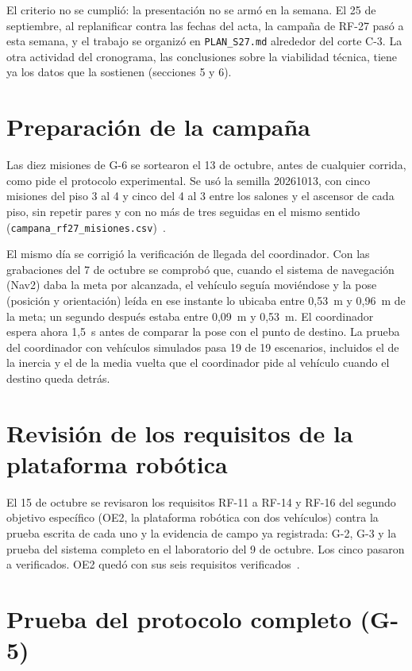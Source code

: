 \documentclass[12pt,letterpaper]{article}
\begin{document}
El criterio no se cumplió: la presentación no se armó en la semana. El 25 de septiembre, al replanificar contra las fechas del acta, la campaña de RF-27 pasó a esta semana, y el trabajo se organizó en \texttt{PLAN\_S27.md} alrededor del corte C-3. La otra actividad del cronograma, las conclusiones sobre la viabilidad técnica, tiene ya los datos que la sostienen (secciones 5 y 6).

\section{Preparación de la campaña}

Las diez misiones de G-6 se sortearon el 13 de octubre, antes de cualquier corrida, como pide el protocolo experimental. Se usó la semilla 20261013, con cinco misiones del piso 3 al 4 y cinco del 4 al 3 entre los salones y el ascensor de cada piso, sin repetir pares y con no más de tres seguidas en el mismo sentido (\texttt{campana\_rf27\_misiones.csv})~\cite{plan,estado}.

El mismo día se corrigió la verificación de llegada del coordinador. Con las grabaciones del 7 de octubre se comprobó que, cuando el sistema de navegación (Nav2) daba la meta por alcanzada, el vehículo seguía moviéndose y la pose (posición y orientación) leída en ese instante lo ubicaba entre 0,53~m y 0,96~m de la meta; un segundo después estaba entre 0,09~m y 0,53~m. El coordinador espera ahora 1,5~s antes de comparar la pose con el punto de destino. La prueba del coordinador con vehículos simulados pasa 19 de 19 escenarios, incluidos el de la inercia y el de la media vuelta que el coordinador pide al vehículo cuando el destino queda detrás.

\section{Revisión de los requisitos de la plataforma robótica}

El 15 de octubre se revisaron los requisitos RF-11 a RF-14 y RF-16 del segundo objetivo específico (OE2, la plataforma robótica con dos vehículos) contra la prueba escrita de cada uno y la evidencia de campo ya registrada: G-2, G-3 y la prueba del sistema completo en el laboratorio del 9 de octubre. Los cinco pasaron a verificados. OE2 quedó con sus seis requisitos verificados~\cite{requisitos}.

\section{Prueba del protocolo completo (G-5)}
\end{document}
